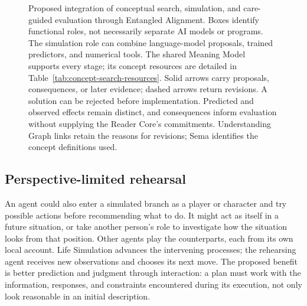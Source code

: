 \documentclass[10pt]{article}
\begin{document}
\begin{figure}[!htbp]
\caption{Proposed integration of conceptual search, simulation, and
care-guided evaluation through Entangled Alignment. Boxes identify functional
roles, not necessarily separate AI models or programs. The simulation role
can combine language-model proposals, trained predictors, and numerical tools.
The shared Meaning Model supports every stage; its
concept resources are detailed in Table~\ref{tab:concept-search-resources}.
Solid arrows carry proposals, consequences, or later evidence; dashed arrows
return revisions. A solution can be rejected before implementation. Predicted
and observed effects remain distinct, and consequences inform evaluation
without supplying the Reader Core's commitments. Understanding Graph links
retain the reasons for revisions; Sema identifies the concept definitions used.}
\label{fig:concept-solution-loop}
\end{figure}

\subsection{Perspective-limited rehearsal}
\label{sec:rehearsal}

An agent could also enter a simulated branch as a player or character and
try possible actions before recommending what to do. It might act as itself
in a future situation, or take another person's role to investigate how the
situation looks from that position. Other agents play the counterparts, each
from its own local account. Life Simulation advances the intervening processes;
the rehearsing agent receives new observations and chooses its next move.
The proposed benefit is better prediction and judgment through interaction:
a plan must work with the information, responses, and constraints encountered
during its execution, not only look reasonable in an initial description.
\end{document}
